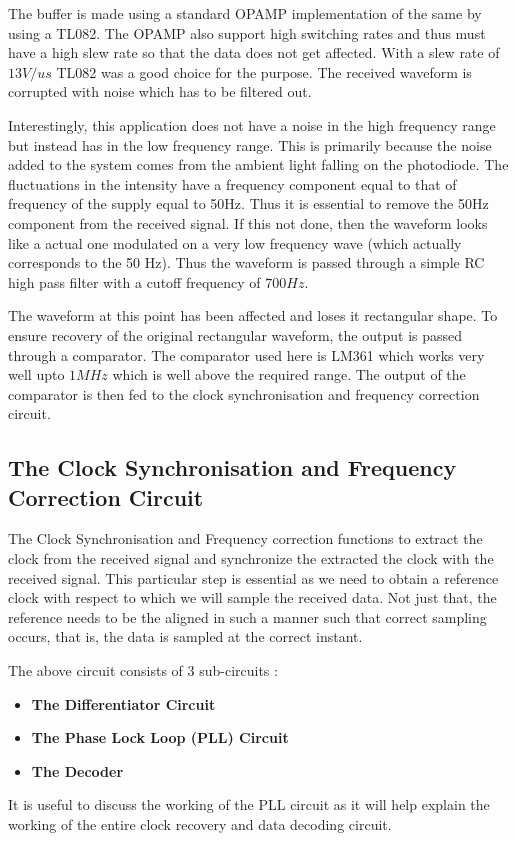 \documentclass{article}
\begin{document}
The buffer is made using a standard OPAMP implementation of the same by using a TL082. The OPAMP also support high switching rates and thus must have a high slew rate so that the data does not get affected. With a slew rate of $13V/us$ TL082 was a good choice for the purpose. The received waveform is corrupted with noise which has to be filtered out.

Interestingly, this application does not have a noise in the high frequency range but instead has in the low frequency range. This is primarily because the noise added to the system comes from the ambient light falling on the photodiode. The fluctuations in the intensity have a frequency component equal to that of frequency of the supply equal to 50Hz. Thus it is essential to remove the 50Hz component from the received signal. If this not done, then the waveform looks like a actual one modulated on a very low frequency wave (which actually corresponds to the 50 Hz).  Thus the waveform is passed through a simple RC high pass filter with a cutoff frequency of $700 Hz$.

The waveform at this point has been affected and loses it rectangular shape. To ensure recovery of the original rectangular waveform, the output is passed through a comparator. The comparator used here is LM361 which works very well upto $1 MHz$ which is well above the required range. The output of the comparator is then fed to the clock synchronisation and frequency correction circuit.


\subsection{The Clock Synchronisation and Frequency Correction Circuit}
The Clock Synchronisation and Frequency correction functions to extract the clock from the received signal and synchronize the extracted the clock with the received signal. This particular step is essential as we need to obtain a reference clock with respect to which  we will sample the received data. Not just that, the reference needs to be the aligned in such a manner such that correct sampling occurs, that is, the data is sampled at the correct instant.

The above circuit consists of 3 sub-circuits :
\begin{itemize}
\item \textbf{The Differentiator Circuit}
\item \textbf{The Phase Lock Loop (PLL) Circuit}
\item \textbf{The Decoder}
\end{itemize}
It is useful to discuss the working of the PLL circuit as it will help explain the working of the entire clock recovery and data decoding circuit.
\end{document}
